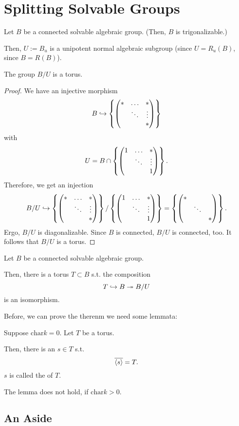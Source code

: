 \section{Splitting Solvable Groups}
Let $B$ be a connected solvable algebraic group. (Then, $B$ is trigonalizable.)

Then, $U := B_u$ is a unipotent normal algebraic subgroup (since $U = R_u(B)$, since $B = R(B)$).

\begin{lemma}
	The group $B / U$ is a torus.
\end{lemma}
\begin{proof}
	We have an injective morphism
	\[ B \overset{}{\hookrightarrow} \left\lbrace\left(\begin{matrix} * & \ldots & * \\  & \ddots & \vdots \\ & & * \end{matrix}\right)\right\rbrace\]
	with
	\[ U = B \cap \left\lbrace\left(\begin{matrix} 1 & \ldots & * \\  & \ddots & \vdots \\ & & 1 \end{matrix}\right)\right\rbrace. \]
	Therefore, we get an injection
	\[B / U \overset{}{\hookrightarrow} \left\lbrace\left(\begin{matrix} * & \ldots & * \\  & \ddots & \vdots \\ & & * \end{matrix}\right)\right\rbrace / \left\lbrace\left(\begin{matrix} 1 & \ldots & * \\  & \ddots & \vdots \\ & & 1 \end{matrix}\right)\right\rbrace = \left\lbrace\left(\begin{matrix} * &  &  \\  & \ddots & \\ & & * \end{matrix}\right)\right\rbrace. \]
	Ergo, $B/U$ is diagonalizable. Since $B$ is connected, $B/U$ is connected, too.
	It follows that $B/U$ is a torus.
\end{proof}

\begin{theorem}
	Let $B$ be a connected solvable algebraic group.
	
	Then, there is a torus $T \subset B$ s.t. the composition
	\[ T \overset{}{\hookrightarrow} B \overset{}{\twoheadrightarrow} B/U \]
	is an isomorphism.
\end{theorem}
Before, we can prove the therenm we need some lemmata:

\begin{lemma}
	Suppose $\mathrm{char} k = 0$. Let $T$ be a torus.
	
	Then, there is an $s \in T$ s.t.
	\[ \overline{\left<s\right>} = T. \]
	$s$ is called the  of $T$.
\end{lemma}
\begin{remark}
	The lemma does not hold, if $\mathrm{char} k > 0$.
\end{remark}


\subsection{An Aside}